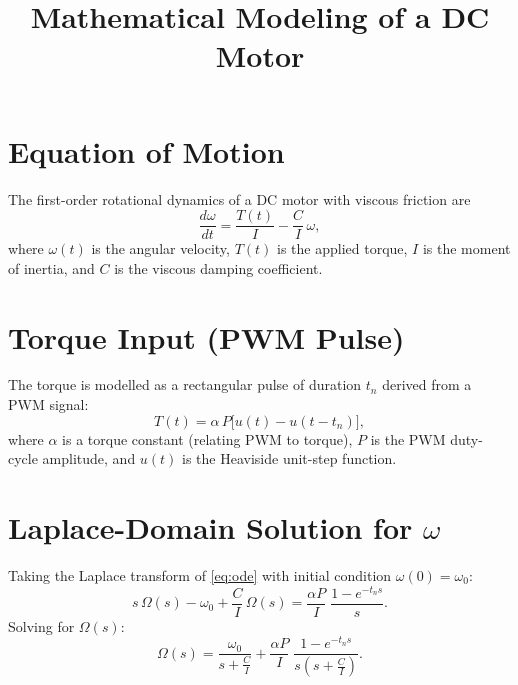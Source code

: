 \documentclass[11pt,a4paper]{article}
\title{Mathematical Modeling of a DC Motor}
\author{}
\date{}
\begin{document}
\maketitle

\section{Equation of Motion}

The first-order rotational dynamics of a DC motor with viscous friction are
\begin{equation}\label{eq:ode}
  \frac{d\omega}{dt} = \frac{T(t)}{I} - \frac{C}{I}\,\omega,
\end{equation}
where $\omega(t)$ is the angular velocity, $T(t)$ is the applied torque,
$I$ is the moment of inertia, and $C$ is the viscous damping coefficient.

\section{Torque Input (PWM Pulse)}

The torque is modelled as a rectangular pulse of duration $t_n$ derived from
a PWM signal:
\begin{equation}\label{eq:torque}
  T(t) = \alpha\, P\bigl[u(t) - u(t - t_n)\bigr],
\end{equation}
where $\alpha$ is a torque constant (relating PWM to torque),
$P$ is the PWM duty-cycle amplitude, and $u(t)$ is the Heaviside unit-step
function.

\section{Laplace-Domain Solution for $\omega$}

Taking the Laplace transform of \eqref{eq:ode} with initial condition
$\omega(0)=\omega_0$:
\[
  s\,\Omega(s) - \omega_0 + \frac{C}{I}\,\Omega(s)
  = \frac{\alpha P}{I}\;\frac{1 - e^{-t_n s}}{s}.
\]
Solving for $\Omega(s)$:
\begin{equation}\label{eq:Omega_s}
  \Omega(s)
  = \frac{\omega_0}{s + \frac{C}{I}}
  + \frac{\alpha P}{I}\;\frac{1 - e^{-t_n s}}{s\!\left(s + \frac{C}{I}\right)}.
\end{equation}
\end{document}
